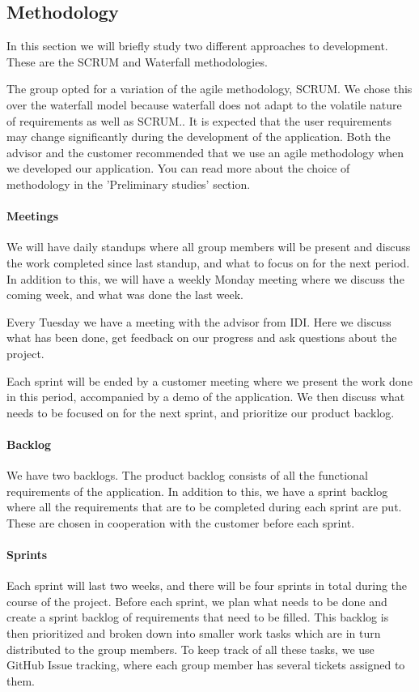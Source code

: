 \subsection{Methodology}
In this section we will briefly study two different approaches to development.
These are the SCRUM and Waterfall methodologies.

The group opted for a variation of the agile methodology, SCRUM. We chose this
over the waterfall model because waterfall does not adapt to the volatile
nature of requirements as well as SCRUM.. 
It is expected that the user requirements may change significantly during the
development of the application. Both the advisor and the customer
recommended that we use an agile methodology when we developed our application.
You can read more about the choice of methodology in the 'Preliminary studies'
section. 

\paragraph{Meetings}
We will have daily standups where all group members will be present and discuss
the work completed since last standup, and what to focus on for the next period.
In addition to this, we will have a weekly Monday meeting where we discuss the
coming week, and what was done the last week. 

Every Tuesday we have a meeting with the advisor from IDI. Here we discuss what
has been done, get feedback on our progress and ask questions about the project.

Each sprint will be ended by a customer meeting where we present the work done
in this period, accompanied by a demo of the application. We then discuss what
needs to be focused on for the next sprint, and prioritize our product
backlog. 

\paragraph{Backlog}
We have two backlogs. The product backlog consists of all the functional
requirements of the application. In addition to this, we have a sprint backlog
where all the requirements that are to be completed during each sprint are put.
These are chosen in cooperation with the customer before each sprint. 

\paragraph{Sprints}
Each sprint will last two weeks, and there will be four sprints in total during
the course of the project. Before each sprint, we plan what needs to be done and
create a sprint backlog of requirements that need to be filled. This backlog is
then prioritized and broken down into smaller work tasks which are in turn
distributed to the group members. To keep track of all these tasks, we use GitHub
Issue tracking, where each group member has several tickets assigned to them.

